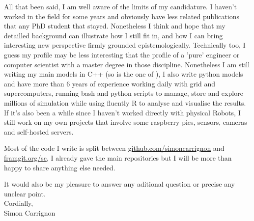 \documentclass[10pt]{article}
\begin{document}
All that been said, I am well aware of the limits of my candidature. I haven't worked in the field for some years and obviously have less related publications that any PhD student that stayed. Nonetheless I think and hope that my detailled background can illustrate how I still fit in, and how I can bring interesting new perspective firmly grounded epistemologically. Technically too, I guess my profile may be less interesting that the profile of a 'pure' engineer or computer scientist with a master degree in those discipline.  Nonetheless I am still writing my main models in C++ (so is the one of \cite{carrignon2015modelingthecoevolutionoftradeandcultureinpastsocieties}), I also write python models and have more than 6 years of experience working daily with grid and supercomputers, running bash and python scripts to manage, store and  explore millions of simulation while using fluently R to analyse and visualise the results. If it's also been a while since I haven't worked directly with physical Robots, I still work on my own projects that involve some raspberry pies, sensors, cameras and self-hosted servers.

Most of the code I write is split between \url{github.com/simoncarrignon} and \url{framgit.org/sc}, I already gave the main repositories but I will be more than happy to share anything else needed. 

It would also be my pleasure to answer any aditional question or precise any unclear point.\\

\vspace{.2cm}
\noindent Cordially,\\
Simon Carrignon



                   
\end{document}
